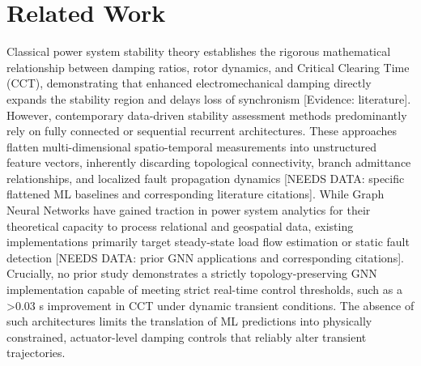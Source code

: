 \documentclass[11pt,a4paper]{article}
\begin{document}
\section{Related Work}
Classical power system stability theory establishes the rigorous mathematical relationship between damping ratios, rotor dynamics, and Critical Clearing Time (CCT), demonstrating that enhanced electromechanical damping directly expands the stability region and delays loss of synchronism [Evidence: literature]. However, contemporary data-driven stability assessment methods predominantly rely on fully connected or sequential recurrent architectures. These approaches flatten multi-dimensional spatio-temporal measurements into unstructured feature vectors, inherently discarding topological connectivity, branch admittance relationships, and localized fault propagation dynamics [NEEDS DATA: specific flattened ML baselines and corresponding literature citations]. While Graph Neural Networks have gained traction in power system analytics for their theoretical capacity to process relational and geospatial data, existing implementations primarily target steady-state load flow estimation or static fault detection [NEEDS DATA: prior GNN applications and corresponding citations]. Crucially, no prior study demonstrates a strictly topology-preserving GNN implementation capable of meeting strict real-time control thresholds, such as a >0.03 s improvement in CCT under dynamic transient conditions. The absence of such architectures limits the translation of ML predictions into physically constrained, actuator-level damping controls that reliably alter transient trajectories.
\end{document}
